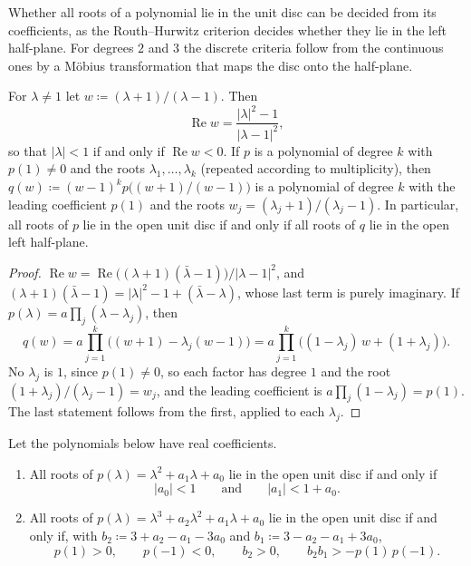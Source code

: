 Whether all roots of a polynomial lie in the unit disc can be decided from its coefficients, as the Routh--Hurwitz criterion decides whether they lie in the left half-plane. For degrees $2$ and $3$ the discrete criteria follow from the continuous ones by a M\"obius transformation that maps the disc onto the half-plane.

\begin{lemma}
\label{lem:cayley-transform}
For $\lambda\ne1$ let $w\coloneqq(\lambda+1)/(\lambda-1)$. Then
\[
\operatorname{Re}w=\frac{|\lambda|^2-1}{|\lambda-1|^2},
\]
so that $|\lambda|<1$ if and only if $\operatorname{Re}w<0$. If $p$ is a polynomial of degree $k$ with $p(1)\ne0$ and the roots $\lambda_1,\ldots,\lambda_k$ (repeated according to multiplicity), then $q(w)\coloneqq(w-1)^kp\bigl((w+1)/(w-1)\bigr)$ is a polynomial of degree $k$ with the leading coefficient $p(1)$ and the roots $w_j=(\lambda_j+1)/(\lambda_j-1)$. In particular, all roots of $p$ lie in the open unit disc if and only if all roots of $q$ lie in the open left half-plane.
\end{lemma}

\begin{proof}
$\operatorname{Re}w=\operatorname{Re}\bigl((\lambda+1)(\bar\lambda-1)\bigr)/|\lambda-1|^2$, and $(\lambda+1)(\bar\lambda-1)=|\lambda|^2-1+(\bar\lambda-\lambda)$, whose last term is purely imaginary. If $p(\lambda)=a\prod_j(\lambda-\lambda_j)$, then
\[
q(w)=a\prod_{j=1}^k\bigl((w+1)-\lambda_j(w-1)\bigr)=a\prod_{j=1}^k\bigl((1-\lambda_j)\,w+(1+\lambda_j)\bigr).
\]
No $\lambda_j$ is $1$, since $p(1)\ne0$, so each factor has degree $1$ and the root $(1+\lambda_j)/(\lambda_j-1)=w_j$, and the leading coefficient is $a\prod_j(1-\lambda_j)=p(1)$. The last statement follows from the first, applied to each $\lambda_j$.
\end{proof}

\begin{theorem}
\label{thm:jury-small}
Let the polynomials below have real coefficients.
\begin{enumerate}
\item All roots of $p(\lambda)=\lambda^2+a_1\lambda+a_0$ lie in the open unit disc if and only if
\[
|a_0|<1\qquad\text{and}\qquad|a_1|<1+a_0 .
\]
\item All roots of $p(\lambda)=\lambda^3+a_2\lambda^2+a_1\lambda+a_0$ lie in the open unit disc if and only if, with $b_2\coloneqq3+a_2-a_1-3a_0$ and $b_1\coloneqq3-a_2-a_1+3a_0$,
\[
p(1)>0,\qquad p(-1)<0,\qquad b_2>0,\qquad b_2b_1>-p(1)\,p(-1).
\]
\end{enumerate}
\end{theorem}

